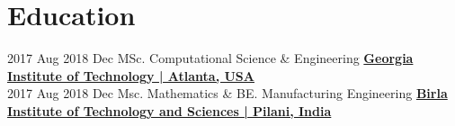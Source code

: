 \documentclass[letterpaper]{DS_class_file} %
\begin{document}
\section{Education}

\begin{twenty} %

   	\twentyitem
	    {2017 Aug}
	    {2018 Dec}
	    {\hspace{0.2cm}MSc. Computational Science \& Engineering}
	    {\href{https://www.gatech.edu/}{\textbf{} }}
	    {\hspace{0.2cm}\href{https://www.gatech.edu/}{\textbf{Georgia Institute of Technology | Atlanta, USA} }}
        \\
    \twentyitem
	    {2017 Aug}
	    {2018 Dec}
	    {\hspace{0.2cm}Msc. Mathematics \& BE. Manufacturing Engineering}
	    {\href{https://www.gatech.edu/}{\textbf{} }}
	    {\hspace{0.2cm}\href{https://www.gatech.edu/}{\textbf{Birla Institute of Technology and Sciences | Pilani, India} }}
        \\
\end{twenty}


\end{document}
